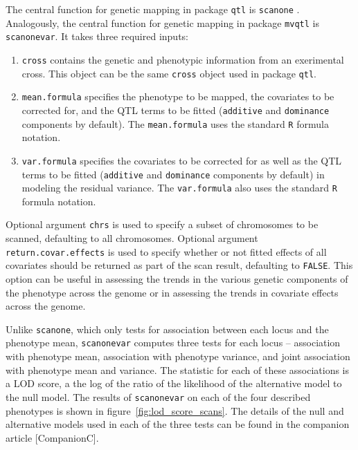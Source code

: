 \documentclass{article}
\begin{document}
The central function for genetic mapping in package \texttt{qtl} is \texttt{scanone} \citep{Broman2003}.
Analogously, the central function for genetic mapping in package \texttt{mvqtl} is \texttt{scanonevar}.
It takes three required inputs:

\begin{enumerate}
    \item \texttt{cross} contains the genetic and phenotypic information from an exerimental cross.  This object can be the same \texttt{cross} object used in package \texttt{qtl}.
    \item \texttt{mean.formula} specifies the phenotype to be mapped, the covariates to be corrected for, and the QTL terms to be fitted (\texttt{additive} and \texttt{dominance} components by default).  The \texttt{mean.formula} uses the standard \texttt{R} formula notation.
    \item \texttt{var.formula} specifies the covariates to be corrected for as well as the QTL terms to be fitted (\texttt{additive} and \texttt{dominance} components by default) in modeling the residual variance.  The \texttt{var.formula} also uses the standard \texttt{R} formula notation.
\end{enumerate}

Optional argument \texttt{chrs} is used to specify a subset of chromosomes to be scanned, defaulting to all chromosomes.
Optional argument \texttt{return.covar.effects} is used to specify whether or not fitted effects of all covariates should be returned as part of the scan result, defaulting to \texttt{FALSE}.
This option can be useful in assessing the trends in the various genetic components of the phenotype across the genome or in assessing the trends in covariate effects across the genome.

Unlike \texttt{scanone}, which only tests for association between each locus and the phenotype mean, \texttt{scanonevar} computes three tests for each locus -- association with phenotype mean, association with phenotype variance, and joint association with phenotype mean and variance.
The statistic for each of these associations is a LOD score, a the log of the ratio of the likelihood of the alternative model to the null model.
The results of \texttt{scanonevar} on each of the four described phenotypes is shown in figure~\ref{fig:lod_score_scans}.
The details of the null and alternative models used in each of the three tests can be found in the companion article [CompanionC].
\end{document}
